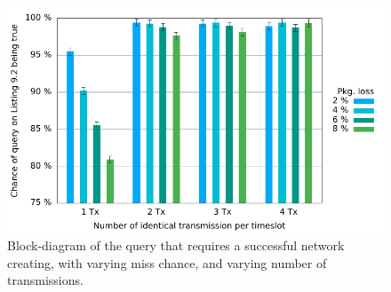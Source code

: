 \begin{figure}[p]
  \includegraphics[width=1\textwidth]{Figures/Graphs/gnuplot/ccucChance/graph2.pdf} 
\caption{Block-diagram of the query that requires a successful network creating, with varying miss chance, and varying number of transmissions.}
\label{CCUC-Graph-UPPAAL}
\end{figure} 

